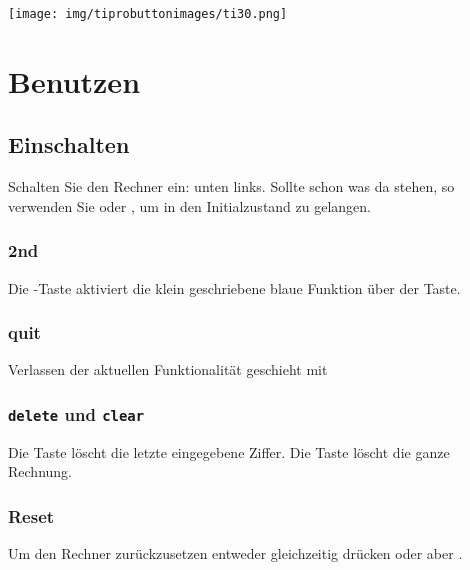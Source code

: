 

\renewcommand{\metaHeaderLine}{Arbeitsblatt}
\renewcommand{\arbeitsblattTitel}{Taschenrechner TI-30 Pro MathPrint
-- Befehle}


\arbeitsblattHeader{}

\begin{center}
\texttt{[image: img/tiprobuttonimages/ti30.png]}
\end{center}
\newpage


\section{Benutzen}
\subsection{Einschalten}
Schalten Sie den Rechner ein:  unten links. Sollte schon
was da stehen, so verwenden Sie \label{clear} oder , um in den
Initialzustand zu gelangen.

\subsubsection{2nd}\label{mehrfachbelegung}
Die -Taste aktiviert die klein geschriebene blaue Funktion über der Taste.

\subsubsection{quit}\label{modus_verlassen}
Verlassen der aktuellen Funktionalität geschieht mit 

\subsubsection{\texttt{delete}
und \texttt{clear}}\label{delete_and_clear}
Die Taste  löscht die letzte eingegebene Ziffer. Die
Taste \label{clear} löscht die ganze Rechnung.


\subsubsection{Reset}
Um den Rechner zurückzusetzen entweder  gleichzeitig drücken oder aber .

